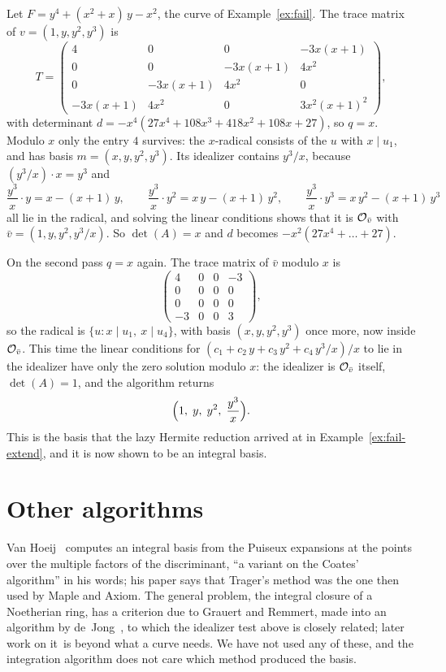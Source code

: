 \begin{example}\label{ex:ib-quartic}
Let $F = y^4 + (x^2 + x)\,y - x^2$, the curve of Example~\ref{ex:fail}. The
trace matrix of $v = (1, y, y^2, y^3)$ is
\[
  T = \begin{pmatrix}
    4 & 0 & 0 & -3x(x+1) \\
    0 & 0 & -3x(x+1) & 4x^2 \\
    0 & -3x(x+1) & 4x^2 & 0 \\
    -3x(x+1) & 4x^2 & 0 & 3x^2(x+1)^2
  \end{pmatrix},
\]
with determinant $d = -x^4 (27x^4 + 108x^3 + 418x^2 + 108x + 27)$, so $q = x$.
Modulo $x$ only the entry $4$ survives: the $x$-radical consists of the $u$
with $x \mid u_1$, and has basis $m = (x, y, y^2, y^3)$. Its idealizer
contains $y^3/x$, because $(y^3/x) \cdot x = y^3$ and
\[
  \frac{y^3}{x} \cdot y = x - (x + 1)\, y, \qquad
  \frac{y^3}{x} \cdot y^2 = x\,y - (x + 1)\, y^2, \qquad
  \frac{y^3}{x} \cdot y^3 = x\,y^2 - (x + 1)\, y^3
\]
all lie in the radical, and solving the linear conditions shows that it is
$\mathcal{O}_{\bar v}$ with $\bar v = (1, y, y^2, y^3/x)$. So $\det(A) = x$ and $d$
becomes $-x^2 (27x^4 + \dots + 27)$.

On the second pass $q = x$ again. The trace matrix of $\bar v$ modulo $x$ is
\[
  \begin{pmatrix} 4 & 0 & 0 & -3 \\ 0 & 0 & 0 & 0 \\ 0 & 0 & 0 & 0 \\ -3 & 0 & 0 & 3 \end{pmatrix},
\]
so the radical is $\{ u : x \mid u_1,\ x \mid u_4 \}$, with basis $(x, y, y^2,
y^3)$ once more, now inside $\mathcal{O}_{\bar v}$. This time the linear conditions
for $(c_1 + c_2\, y + c_3\, y^2 + c_4\, y^3/x)/x$ to lie in the idealizer
have only the zero solution modulo $x$: the idealizer is $\mathcal{O}_{\bar v}$
itself, $\det(A) = 1$, and the algorithm returns
\[
  \Bigl( 1,\; y,\; y^2,\; \frac{y^3}{x} \Bigr) .
\]
This is the basis that the lazy Hermite reduction arrived at in
Example~\ref{ex:fail-extend}, and it is now shown to be an integral basis.
\end{example}

\section{Other algorithms}\label{sec:ib-others}

Van Hoeij~\cite{vanhoeij1994} computes an integral basis from the Puiseux
expansions at the points over the multiple factors of the discriminant, ``a
variant on the Coates' algorithm'' in his words; his paper says that Trager's
method was the one then used by Maple and Axiom. The general problem, the
integral closure of a Noetherian ring, has a criterion due to Grauert and
Remmert, made into an algorithm by de~Jong~\cite{dejong1998}, to which the
idealizer test above is closely related; later work on it\later\ is beyond
what a curve needs. We have not used any of these, and the integration
algorithm does not care which method produced the basis.

